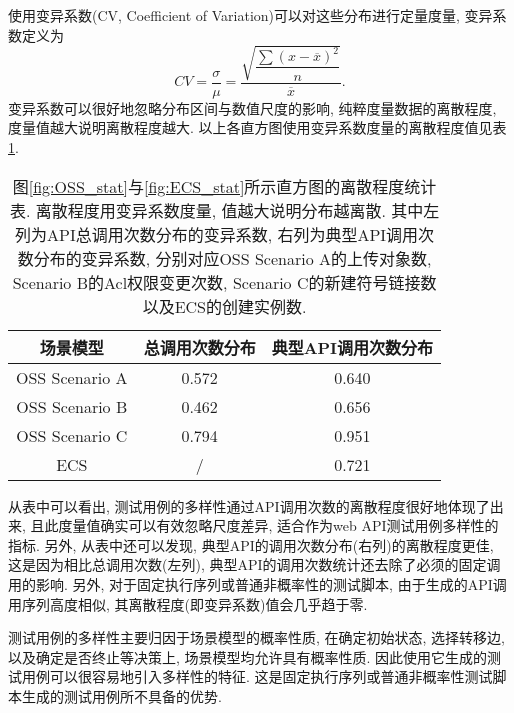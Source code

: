             使用变异系数(CV, Coefficient of Variation)可以对这些分布进行定量度量, 变异系数定义为
            \begin{equation}
                CV = \dfrac{\sigma}{\mu} = \dfrac{\sqrt{\dfrac{\sum (x - \overline{x})^2}{n}}}{\overline{x}}.
            \end{equation}
            变异系数可以很好地忽略分布区间与数值尺度的影响, 纯粹度量数据的离散程度, 度量值越大说明离散程度越大. 以上各直方图使用变异系数度量的离散程度值见表\ref{tab:cv_stat}.
            
            \begin{table}[!htb]
                \centering
                \begin{tabular}{ccc}
                    \toprule
                    场景模型 & 总调用次数分布 & 典型API调用次数分布  \\
                    \midrule
                    OSS Scenario A & 0.572 & 0.640 \\
                    OSS Scenario B & 0.462 & 0.656 \\
                    OSS Scenario C & 0.794 & 0.951 \\
                    \hline
                    ECS & / & 0.721 \\
                    \bottomrule
                \end{tabular}
                \caption[直方图离散程度统计表]{图\ref{fig:OSS_stat}与\ref{fig:ECS_stat}所示直方图的离散程度统计表. 离散程度用变异系数度量, 值越大说明分布越离散. 其中左列为API总调用次数分布的变异系数, 右列为典型API调用次数分布的变异系数, 分别对应OSS Scenario A的上传对象数, Scenario B的Acl权限变更次数, Scenario C的新建符号链接数以及ECS的创建实例数.}
                \label{tab:cv_stat}
            \end{table}
            
            从表中可以看出, 测试用例的多样性通过API调用次数的离散程度很好地体现了出来, 且此度量值确实可以有效忽略尺度差异, 适合作为web API测试用例多样性的指标. 另外, 从表中还可以发现, 典型API的调用次数分布(右列)的离散程度更佳, 这是因为相比总调用次数(左列), 典型API的调用次数统计还去除了必须的固定调用的影响. 另外, 对于固定执行序列或普通非概率性的测试脚本, 由于生成的API调用序列高度相似, 其离散程度(即变异系数)值会几乎趋于零.
            
            测试用例的多样性主要归因于场景模型的概率性质, 在确定初始状态, 选择转移边, 以及确定是否终止等决策上, 场景模型均允许具有概率性质. 因此使用它生成的测试用例可以很容易地引入多样性的特征. 这是固定执行序列或普通非概率性测试脚本生成的测试用例所不具备的优势.
            
